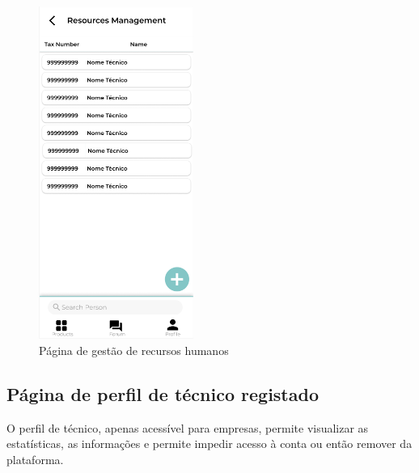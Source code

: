 \begin{figure}[htb]
    \centering
    \includegraphics[width=0.45\textwidth]{images/mockups/human_resources.png}
    \caption{Página de gestão de recursos humanos}
    \label{fig:31}
\end{figure}

\newpage

\subsection{Página de perfil de técnico registado}

O perfil de técnico, apenas acessível para empresas, permite visualizar as estatísticas, as informações e permite impedir acesso à conta ou então remover da plataforma.


